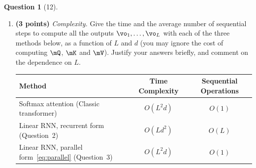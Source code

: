 \documentclass[12pt]{article}
\theoremstyle{definition}
\newtheorem{exercise}{Question}%
\begin{document}
\begin{exercise}[12]
\begin{enumerate}[label=\textbf{\arabic*.}, leftmargin=*]
\item \textbf{(3 points)} \emph{Complexity.} Give the time and the average number of sequential steps to compute
all the outputs $\vo_1, \dots, \vo_L$ with each of the three methods below, as a
function of $L$ and $d$ (you may ignore the cost of computing $\mQ$, $\mK$ and $\mV$).
Justify your answers briefly, and comment on the dependence on $L$.

\begin{center}
\begin{tabular}{lcc}
    \toprule
    Method & Time Complexity & Sequential Operations \\
    \midrule
    Softmax attention (Classic transformer) & \textcolor{answer}{$O(L^2d)$} & \textcolor{answer}{$O(1)$} \\
    Linear RNN, recurrent form (Question~2) & \textcolor{answer}{$O(Ld^2)$} & \textcolor{answer}{$O(L)$} \\
    Linear RNN, parallel form~\eqref{eq:parallel} (Question~3) & \textcolor{answer}{$O(L^2d)$} & \textcolor{answer}{$O(1)$} \\
    \bottomrule
\end{tabular}
\end{center}

\end{enumerate}




\end{exercise}
\end{document}
